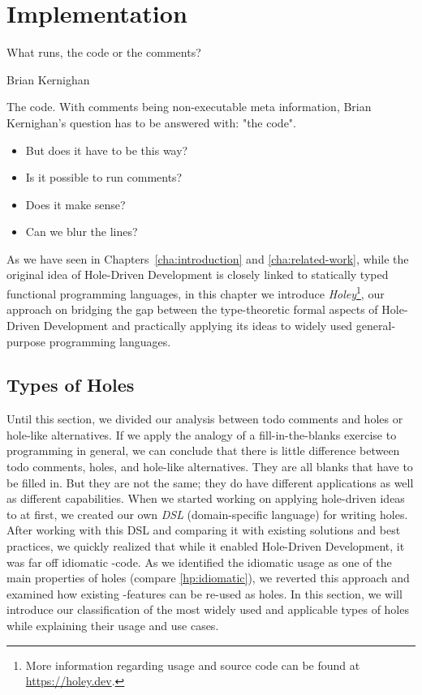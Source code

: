 \chapter{Implementation}
\label{cha:implementation}
\epigraph{What runs, the code or the comments?}{Brian Kernighan}

\noindent
The code.
With comments being non-executable meta information, Brian Kernighan's question has to be answered with: "the code".
\begin{itemize}
    \item But does it have to be this way?
    \item Is it possible to run comments?
    \item Does it make sense?
    \item Can we blur the lines?
\end{itemize}
As we have seen in Chapters~\ref{cha:introduction} and \ref{cha:related-work}, while the original idea of Hole-Driven Development is closely linked to statically typed functional programming languages, in this chapter we introduce \emph{Holey}\footnote{More information regarding usage and source code can be found at \url{https://holey.dev}.}, our approach on bridging the gap between the type-theoretic formal aspects of Hole-Driven Development and practically applying its ideas to widely used general-purpose programming languages.

\section{Types of Holes}
Until this section, we divided our analysis between todo comments and holes or hole-like alternatives.
If we apply the analogy of a fill-in-the-blanks exercise to programming in general, we can conclude that there is little difference between todo comments, holes, and hole-like alternatives.
They are all blanks that have to be filled in.
But they are not the same; they do have different applications as well as different capabilities.
When we started working on applying hole-driven ideas to \CS at first, we created our own \emph{DSL} (domain-specific language) for writing holes.
After working with this DSL and comparing it with existing solutions and best practices, we quickly realized that while it enabled Hole-Driven Development, it was far off idiomatic \CS-code.
As we identified the idiomatic usage as one of the main properties of holes (compare \ref{hp:idiomatic}), we reverted this approach and examined how existing \CS-features can be re-used as holes.
In this section, we will introduce our classification of the most widely used and applicable types of holes while explaining their usage and use cases. 

